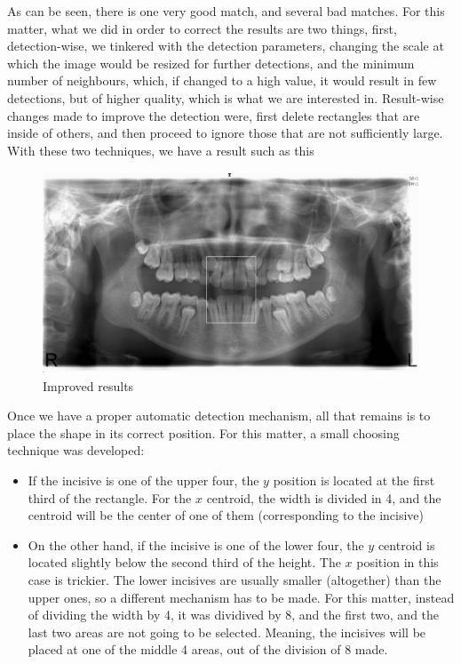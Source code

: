 As can be seen, there is one very good match, and several bad matches. For this
matter, what we did in order to correct the results are two things, 
first, detection-wise, we tinkered with the detection parameters, changing the
scale at which the image would be resized for further detections, and the
minimum number of neighbours, which, if changed to a high value, it would result
in few detections, but of higher quality, which is what we are interested in.
Result-wise changes made to improve the detection were, first delete rectangles
that are inside of others, and then proceed to ignore those that are not
sufficiently large. With these two techniques, we have a result such as
this

\begin{figure}[h]
  \centering
  \includegraphics[height=6cm]{img/teeth_detection_2}
  \caption{Improved results}
\end{figure}

Once we have a proper automatic detection mechanism, all that remains is to place
the shape in its correct position. For this matter, a small choosing technique
was developed:
\begin{itemize}
  \item If the incisive is one of the upper four, the $y$ position is located at
the first third of the rectangle. For the $x$ centroid, the width is divided in 4,
and the centroid will be the center of one of them (corresponding to the
incisive)
  \item On the other hand, if the incisive is one of the lower four, the $y$
centroid is located slightly below the second third of the height. The $x$
position in this case is trickier. The lower incisives are usually smaller
(altogether) than the upper ones, so a different mechanism has to be made. For
this matter, instead of dividing the width by 4, it was dividived by 8, and the
first two, and the last two areas are not going to be selected. Meaning, the
incisives will be placed at one of the middle 4 areas, out of the division of 8
made.  
\end{itemize}
